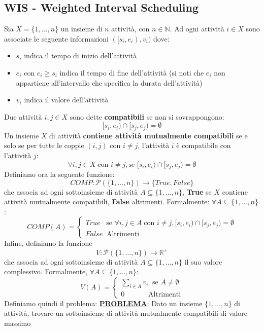 \documentclass[12pt]{article}
\begin{document}
\subsection{WIS - Weighted Interval Scheduling}
Sia $X = \{1,\dots,n\}$ un insieme di $n$ attività, con $n \in \mathbb{N}$. Ad ogni attività
$i \in X$ sono associate le seguente informazioni $([s_i, e_i), v_i)$ dove:
\begin{itemize}
    \item $s_i$ indica il tempo di inizio dell'attività
    \item $e_i$ con $e_i \geq s_i$ indica il tempo di fine dell'attività (si noti che $e_i$ non appartiene all'intervallo che specifica la durata dell'attività)
    \item $v_i$ indica il valore dell'attività
\end{itemize}
Due attività $i,j \in X$ sono dette \textbf{compatibili} se non si sovrappongono:
$$[s_i, e_i) \cap [s_j, e_j) = \emptyset$$
Un insieme $X$ di attività \textbf{contiene attività mutualmente compatibili} se e solo se per tutte le coppie $(i,j)$ con $i \neq j$, l'attività $i$ è compatibile con l'attività $j$:
$$\forall i,j \in X \; \textrm{con } i \neq j, \textrm{se } [s_i, e_i) \cap [s_j, e_j) = \emptyset$$
Definiamo ora la seguente funzione:
$$COMP: \mathcal{P}(\{1,\dots,n\}) \rightarrow \{True, False\}$$
che associa ad ogni sottoinsieme di attività $A \subseteq \{1,\dots,n\}$, \textbf{True} se $X$ contiene
attività mutualmente compatibili, \textbf{False} altrimenti. Formalmente: $\forall A \subseteq \{1,\dots,n\}$:
$$COMP(A) = \begin{cases}
    True \; \; \; \textrm{se } \forall i,j \in A \; \textrm{con } i \neq j, [s_i, e_i) \cap [s_j, e_j) = \emptyset \\
    False \; \; \textrm{Altrimenti}
\end{cases}$$
Infine, definiamo la funzione
$$V: \mathcal{P}(\{1,\dots,n\}) \rightarrow \mathbb{R}^+$$
che associa ad ogni sottoinsieme di attività $A \subseteq \{1,\dots,n\}$ il suo valore complessivo.
Formalmente, $\forall A \subseteq \{1,\dots,n\}$:
$$V(A) = \begin{cases}
    \sum_{i\in A} v_i \; \; \textrm{se } A \neq \emptyset \\
    0 \; \; \; \; \; \; \; \; \; \; \; \; \textrm{Altrimenti}
\end{cases}$$
Definiamo quindi il problema: \newline
\textbf{\underline{PROBLEMA}}: Dato un insieme $\{1,\dots,n\}$ di attività, trovare un sottoinsieme di attività mutualmente compatibili di valore massimo \newline
\end{document}
